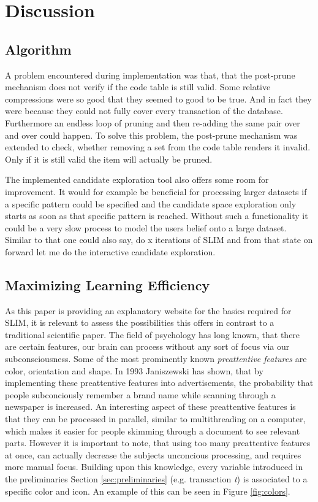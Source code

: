 \documentclass[runningheads]{llncs}
\begin{document}
\section{Discussion}
\subsection{Algorithm}
\label{sec:insights}

A problem encountered during implementation was that, that the post-prune mechanism does not verify if the code table is still valid.
Some relative compressions were so good that they seemed to good to be true. And in fact they were because they could not fully cover every transaction of the database. Furthermore an endless loop of pruning and then re-adding the same pair over and over could happen.
To solve this problem, the post-prune mechanism was extended to check, whether removing a set from the code table renders it invalid. Only if it is still valid the item will actually be pruned.

The implemented candidate exploration tool also offers some room for improvement.
It would for example be beneficial for processing larger datasets if a specific pattern could be specified and the candidate space exploration only starts as soon as that specific pattern is reached.
Without such a functionality it could be a very slow process to model the users belief onto a large dataset.
Similar to that one could also say, do x iterations of SLIM and from that state on forward let me do the interactive candidate exploration.

\subsection{Maximizing Learning Efficiency}
\label{sec:learning}
As this paper is providing an explanatory website for the basics required for SLIM, it is relevant to assess the possibilities this offers in contrast to a traditional scientific paper.
The field of psychology has long known, that there are certain features, our brain can process without any sort of focus via our subconsciousness.
Some of the most prominently known \emph{preattentive features} are color, orientation\cite{healey1996high} and shape\cite{treisman1988feature}.
In 1993 Janiszewski has shown, that by implementing these preattentive features into advertisements, the probability that people subconciously remember a brand name while scanning through a newspaper is increased\cite{janiszewski1993preattentive}.
An interesting aspect of these preattentive features is that they can be processed in parallel, similar to multithreading on a computer, which makes it easier for people skimming through a document to see relevant parts\cite{healey1996high}.
However it is important to note, that using too many preattentive features at once, can actually decrease the subjects unconcious processing, and requires more manual focus\cite{wolfe1992parallel}.
Building upon this knowledge, every variable introduced in the preliminaries Section \ref{sec:preliminaries} (e.g. transaction \emph{t}) is associated to a specific color and icon. An example of this can be seen in Figure \ref{fig:colors}.
\end{document}
